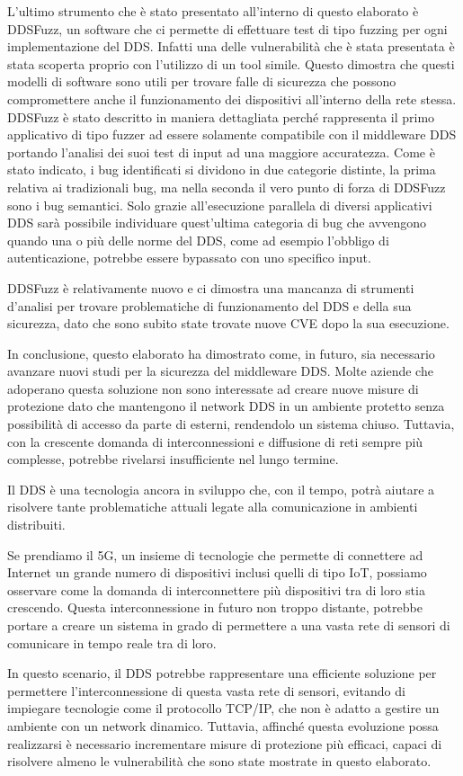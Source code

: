 L'ultimo strumento che è stato presentato all'interno di questo 
elaborato è DDSFuzz, un software che ci permette di effettuare test 
di tipo fuzzing per ogni implementazione del DDS. Infatti una delle 
vulnerabilità che è stata presentata è stata scoperta proprio 
con l'utilizzo di un tool simile. Questo dimostra che questi 
modelli di software sono utili per trovare falle di sicurezza 
che possono compromettere anche il funzionamento dei dispositivi
all'interno della rete stessa. 
DDSFuzz è stato descritto in maniera dettagliata
perché rappresenta il primo applicativo di tipo fuzzer ad essere
solamente  
compatibile con il middleware DDS portando l'analisi dei suoi test di 
input ad una maggiore accuratezza. Come è stato indicato, i bug identificati
si dividono in due categorie distinte, la prima relativa ai tradizionali 
bug, ma nella seconda il vero punto di forza di DDSFuzz
sono i bug semantici.
Solo grazie all'esecuzione parallela di diversi applicativi DDS 
sarà possibile
individuare quest'ultima categoria di bug che avvengono quando 
una o più delle norme del DDS, come ad esempio l'obbligo di 
autenticazione, potrebbe essere bypassato con uno specifico input.

DDSFuzz è relativamente nuovo e ci dimostra 
una mancanza di strumenti d'analisi 
per trovare problematiche di funzionamento
del DDS e della sua sicurezza, dato che sono subito state trovate 
nuove CVE dopo la sua esecuzione. 

In conclusione, questo elaborato ha dimostrato come, in futuro,
sia necessario avanzare nuovi studi per la sicurezza del 
middleware DDS. Molte aziende che adoperano questa soluzione 
non sono interessate ad creare nuove misure di protezione dato che 
mantengono il network DDS in un ambiente 
protetto senza possibilità di accesso da parte di esterni, 
rendendolo un sistema chiuso. 
Tuttavia, con la crescente domanda di interconnessioni
e diffusione di reti sempre più complesse, 
potrebbe rivelarsi insufficiente nel lungo termine.

Il DDS è una tecnologia ancora in 
sviluppo che, con il tempo, potrà aiutare a risolvere tante 
problematiche attuali legate alla comunicazione in 
ambienti distribuiti. 

Se prendiamo il 5G, un insieme di tecnologie che permette 
di connettere ad Internet un grande numero di dispositivi
inclusi quelli di tipo IoT, 
possiamo osservare come la domanda di interconnettere più dispositivi 
tra di loro stia crescendo. Questa interconnessione in futuro 
non troppo distante, potrebbe portare a creare un sistema in 
grado di permettere a una vasta rete di 
sensori di comunicare in tempo reale 
tra di loro.

In questo scenario, il DDS potrebbe rappresentare una efficiente
soluzione per permettere l'interconnessione di questa vasta 
rete di sensori, evitando di impiegare tecnologie come il 
protocollo TCP/IP, che non è adatto a gestire un ambiente con 
un network dinamico. Tuttavia, affinché questa evoluzione possa 
realizzarsi è necessario incrementare misure di protezione 
più efficaci, capaci di risolvere almeno le vulnerabilità che 
sono state mostrate in questo elaborato.